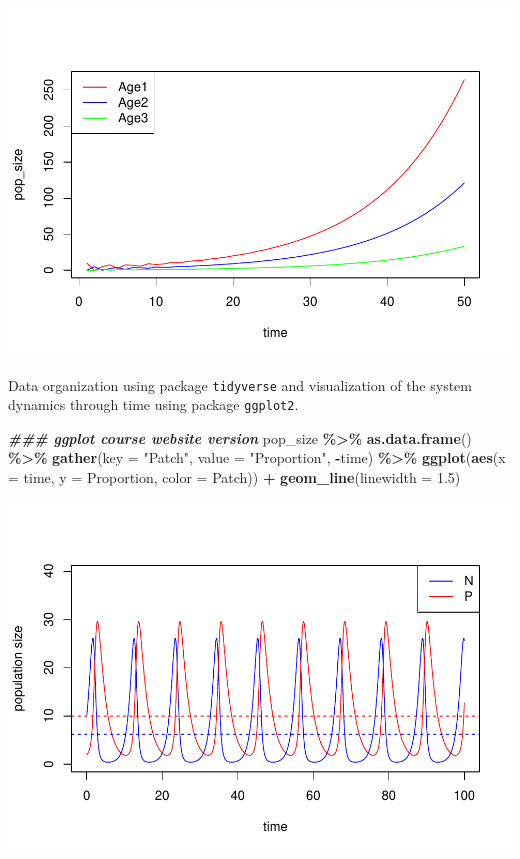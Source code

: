\documentclass[
]{book}
\newenvironment{Shaded}{\begin{snugshade}}{\end{snugshade}}
\newcommand{\AttributeTok}[1]{\textcolor[rgb]{0.13,0.29,0.53}{#1}}
\newcommand{\DocumentationTok}[1]{\textcolor[rgb]{0.56,0.35,0.01}{\textbf{\textit{#1}}}}
\newcommand{\FloatTok}[1]{\textcolor[rgb]{0.00,0.00,0.81}{#1}}
\newcommand{\FunctionTok}[1]{\textcolor[rgb]{0.13,0.29,0.53}{\textbf{#1}}}
\newcommand{\NormalTok}[1]{#1}
\newcommand{\SpecialCharTok}[1]{\textcolor[rgb]{0.81,0.36,0.00}{\textbf{#1}}}
\newcommand{\StringTok}[1]{\textcolor[rgb]{0.31,0.60,0.02}{#1}}
\begin{document}
\includegraphics{bookdown-demo_files/figure-latex/unnamed-chunk-23-1.pdf}

Data organization using package \texttt{tidyverse} and visualization of the system dynamics through time using package \texttt{ggplot2}.

\begin{Shaded}
\begin{Highlighting}[]
\DocumentationTok{\#\#\# ggplot course website version}
\NormalTok{pop\_size }\SpecialCharTok{\%\textgreater{}\%}
  \FunctionTok{as.data.frame}\NormalTok{() }\SpecialCharTok{\%\textgreater{}\%}
  \FunctionTok{gather}\NormalTok{(}\AttributeTok{key =} \StringTok{"Patch"}\NormalTok{, }\AttributeTok{value =} \StringTok{"Proportion"}\NormalTok{, }\SpecialCharTok{{-}}\NormalTok{time) }\SpecialCharTok{\%\textgreater{}\%}
  \FunctionTok{ggplot}\NormalTok{(}\FunctionTok{aes}\NormalTok{(}\AttributeTok{x =}\NormalTok{ time, }\AttributeTok{y =}\NormalTok{ Proportion, }\AttributeTok{color =}\NormalTok{ Patch)) }\SpecialCharTok{+}
  \FunctionTok{geom\_line}\NormalTok{(}\AttributeTok{linewidth =} \FloatTok{1.5}\NormalTok{)}
\end{Highlighting}
\end{Shaded}

\includegraphics{bookdown-demo_files/figure-latex/unnamed-chunk-24-1.pdf}
\end{document}
